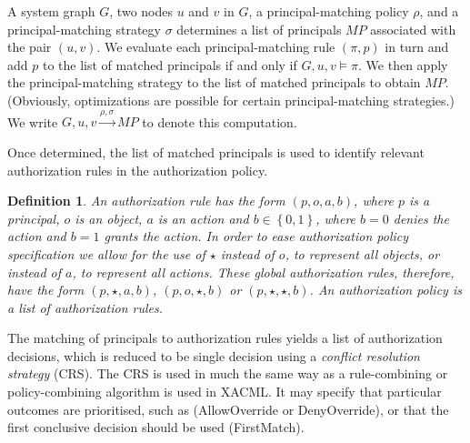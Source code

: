 \documentclass{article}
\newtheorem{definition}{Definition}
\newcommand{\set}[1]{\ensuremath{\left\{#1\right\}}} \newcommand{\sett}[1]{\ensuremath{\left\{\textit{#1}\right\}}} \newcommand{\tuple}[1]{\ensuremath{\left(#1\right)}} \newcommand{\tuplet}[1]{\ensuremath{\left(\textit{#1}\right)}}
\renewcommand{\mp}{\mathit{MP}}
\begin{document}
A system graph $G$, two nodes $u$ and $v$ in $G$, a principal-matching policy $\rho$, and a principal-matching strategy $\sigma$ determines a list of principals $\mp$ associated with the pair $(u,v)$.
We evaluate each principal-matching rule $(\pi,p)$ in turn and add $p$ to the list of matched principals if and only if $G,u,v \models \pi$.
We then apply the principal-matching strategy to the list of matched principals to obtain $\mp$.
(Obviously, optimizations are possible for certain principal-matching strategies.)
We write $G,u,v \xrightarrow{\rho,\sigma} \mp$ to denote this computation.

Once determined, the list of matched principals is used to identify relevant authorization rules in the authorization policy.

\begin{definition}
    An \emph{authorization rule} has the form $(p,o,a,b)$, where $p$ is a principal, $o$ is an object, $a$ is an action and $b \in \set{0,1}$, where $b = 0$ denies the action and $b = 1$ grants the action.
    In order to ease authorization policy specification we allow for the use of $\star$ instead of $o$, to represent all objects, or instead of $a$, to represent all actions.
    These global authorization rules, therefore, have the form $(p,\star,a,b)$, $(p,o,\star,b)$ or $(p, \star, \star, b)$.
    An \emph{authorization policy} is a list of authorization rules.
\end{definition}

The matching of principals to authorization rules yields a list of authorization decisions, which is reduced to be single decision using a \emph{conflict resolution strategy} (CRS).
The CRS is used in much the same way as a rule-combining or policy-combining algorithm is used in XACML.
It may specify that particular outcomes are prioritised, such as (\textsf{AllowOverride} or \textsf{DenyOverride}), or that the first conclusive decision should be used (\textsf{FirstMatch}).
\end{document}
